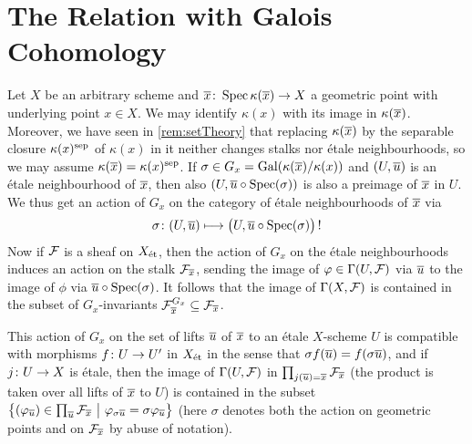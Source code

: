 \section{The Relation with Galois Cohomology}
\begin{rem}\label{rem:GaloisAction}
	Let $X$ be an arbitrary scheme and $\ov{x}\colon \Spec \kappa(\ov{x})\morphism X$ a geometric point with underlying point $x\in X$. We may identify $\kappa(x)$ with its image in $\kappa(\ov{x})$. Moreover, we have seen in \cref{rem:setTheory} that replacing $\kappa(\ov{x})$ by the separable closure $\kappa(x)^{\mathrm{sep}}$ of $\kappa(x)$ in it neither changes stalks nor étale neighbourhoods, so we may assume $\kappa(\ov{x})=\kappa(x)^\sep$. If $\sigma\in G_x= \Gal(\kappa(\ov{x})/\kappa(x))$ and $(U,\ov{u})$ is an étale neighbourhood of $\ov{x}$, then also $(U,\ov{u}\circ \Spec(\sigma))$ is also a preimage of $\ov{x}$ in $U$. We thus get an action of $G_x$ on the category of étale neighbourhoods of $\ov{x}$ via
	\begin{equation*}
		\sigma\colon (U,\ov{u})\longmapsto \big(U,\ov{u}\circ \Spec(\sigma)\big)\,!
	\end{equation*}
	Now if $\mathcal{F}$ is a sheaf on $X_{\mathrm{\acute{e}t}}$, then the action of $G_x$ on the étale neighbourhoods induces an action on the stalk $\Ff_{\ov{x}}$, sending the image of $\varphi\in \operatorname{\Gamma}(U,\mathcal{F})$ via $\ov{u}$ to the image of $\phi$ via $\ov{u}\circ \Spec(\sigma)$. It follows that the image of $\operatorname{\Gamma}(X,\mathcal{F})$ is contained in the subset of $G_x$-invariants $\Ff_{\ov{x}}^{G_x}\subseteq \Ff_{\ov{x}}$.
	
	This action of $G_x$ on the set of lifts $\ov{u}$ of $\ov{x}$ to an étale $X$-scheme $U$ is compatible with morphisms $f\colon U\morphism U'$ in $X_{\mathrm{\acute{e}t}}$ in the sense that $\sigma f(\ov{u})=f(\sigma \ov{u})$, and if $j\colon U\morphism X$ is étale, then the image of $\operatorname{\Gamma}(U,\mathcal{F})$ in $\prod_{j(\ov{u})=\ov{x}}\Ff_{\ov{x}}$ (the product is taken over all lifts of $\ov{x}$ to $U$) is contained in the subset $\big\{(\phi_{\ov{u}})\in \prod_{\ov{u}}\Ff_{\ov{x}}\ \big|\ \phi_{\sigma \ov{u}}=\sigma \phi_{\ov{u}}\big\}$ (here $\sigma$ denotes both the action on geometric points and on $\Ff_{\ov{x}}$ by abuse of notation).
\end{rem}
